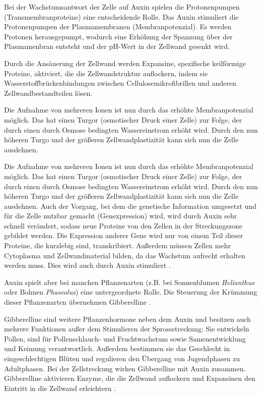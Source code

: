 \documentclass[
a4paper, 
11pt, 
ngerman,
listof=totoc,
bibliography=totocnumbered,
abstracton
]{scrreprt}
\begin{document}
Bei der Wachstumsantwort der Zelle auf Auxin spielen die Protonenpumpen (Transmembranproteine) eine entscheidende Rolle. Das Auxin stimuliert die Protonenpumpen der Plasmamembranen (Membranpotenzial). Es werden Protonen herausgepumpt, wodurch eine Erhöhung der Spannung über der Plasmamenbran entsteht und der pH-Wert in der Zellwand gesenkt wird. 

Durch die Ansäuerung  der Zellwand werden Expansine, spezifische keilförmige Proteine, aktiviert, die die Zellwandstruktur auflockern, indem sie Wasserstoffbrückenbindungen zwischen Cellulosemikrofibrillen und anderen Zellwandbestandteilen lösen.

Die Aufnahme von mehreren Ionen ist nun durch das erhöhte Membranpotenzial möglich. Das hat einen Turgor (osmotischer Druck einer Zelle) zur Folge, der durch einen durch Osmose bedingten Wassereinstrom erhöht wird. Durch den nun höheren Turgo und der größeren Zellwandplastizität kann sich nun die Zelle ausdehnen.

Die Aufnahme von mehreren Ionen ist nun durch das erhöhte Membranpotenzial möglich. Das hat einen Turgor (osmotischer Druck einer Zelle) zur Folge, der durch einen durch Osmose bedingten Wassereinstrom erhöht wird. Durch den nun höheren Turgo und der größeren Zellwandplastizität kann sich nun die Zelle ausdehnen.
Auch der Vorgang, bei dem die genetische Information umgesetzt  und für die Zelle nutzbar gemacht (Genexpression) wird, wird durch Auxin sehr schnell verändert, sodass neue Proteine von den Zellen in der Streckungszone gebildet werden.
Die Expression anderer Gene wird nur von einem Teil dieser Proteine, die kurzlebig sind, transkribiert. 
Außerdem müssen Zellen mehr Cytoplasma und Zellwandmaterial bilden, da das Wachstum aufrecht erhalten werden muss. Dies wird auch durch Auxin stimuliert \parencite[1118ff]{campbell}.

Auxin spielt aber bei manchen Pflanzenarten (z.B. bei Sonnenblumen \emph{Helianthus} oder Bohnen \emph{Phaseolus}) eine untergeordnete Rolle.
Die Steuerung der Krümmung dieser Pflanzenarten übernehmen Gibberelline \parencite[502f]{Nultsch}.
 
Gibberelline sind weitere Pflanzenhormone neben dem Auxin und besitzen auch mehrere Funktionen außer dem Stimulieren der Sprossstreckung:
Sie entwickeln Pollen, sind für Pollenschlauch- und Fruchtwachstum sowie Samenentwicklung und Keimung verantwortlich. Außerdem bestimmen sie das Geschlecht in eingeschlechtigen Blüten und regulieren den Übergang von Jugendphasen zu Adultphasen. 
Bei der Zellstreckung wirken Gibberelline mit Auxin zusammen. Gibberelline aktivieren Enzyme, die die Zellwand auflockern und Expansinen den Eintritt in die Zellwand erleichtern \parencite[1122f]{campbell}.
\end{document}

